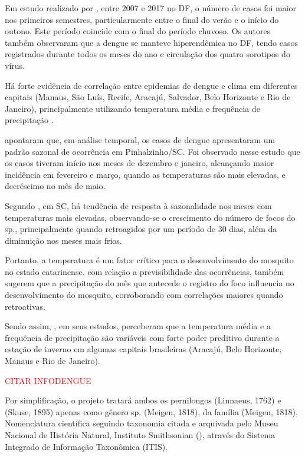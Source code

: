 \indent Em estudo realizado por , entre 2007 e 2017 no \acrfull{DF}, o número de casos foi maior nos primeiros semestres, particularmente entre o final do verão e o início do outono. Este período  coincide com o final do período chuvoso. Os autores também observaram que a dengue se manteve hiperendêmica no \acrlong{DF}, tendo casos registrados durante todos os meses do ano e circulação dos quatro sorotipos do vírus.

\indent Há forte evidência de correlação entre epidemias de dengue e clima em diferentes capitais (Manaus, São Luís, Recife, Aracajú, Salvador, Belo Horizonte e Rio de Janeiro), principalmente utilizando temperatura média e frequência de precipitação \cite{ForecastingDengueBrazil2019}.

\indent {} apontaram que, em análise temporal, os casos de dengue apresentaram um padrão sazonal de ocorrência em Pinhalzinho/\acrshort{SC}. Foi observado nesse estudo que os casos tiveram início nos meses de dezembro e janeiro, alcançando
maior incidência em fevereiro e março, quando as temperaturas são mais elevadas, e decréscimo no mês de maio.

\indent Segundo , em \acrlong{SC}, há tendência de resposta à sazonalidade nos meses com temperaturas mais elevadas, observando-se o crescimento do número de focos do  sp.,  principalmente quando retroagidos por um período de 30 dias, além da diminuição nos meses mais frios.

\indent Portanto, a temperatura é um fator crítico para o desenvolvimento do mosquito no estado catarinense. com relação a previsibilidade das ocorrências,  também sugerem que a precipitação do mês que antecede o registro do foco influencia no desenvolvimento do mosquito, corroborando com correlações maiores quando retroativas.

\indent Sendo assim, , em seus estudos, perceberam que a temperatura média e a frequência de precipitação são variáveis com forte poder preditivo durante a estação de inverno em algumas capitais brasileiras (Aracajú, Belo Horizonte, Manaus e Rio de Janeiro).

\indent \textcolor{red}{CITAR INFODENGUE}

\indent Por simplificação, o projeto tratará ambos os pernilongos  (Linnaeus, 1762) e  (Skuse, 1895) apenas como gênero  sp. (Meigen, 1818), da família  (Meigen, 1818). Nomenclatura científica seguindo taxonomia citada e arquivada pelo Museu Nacional de História Natural, Instituto Smithsonian (\citeyear{ITIS}), através do Sistema Integrado de Informação Taxonômica (\acrfull{ITIS}).


